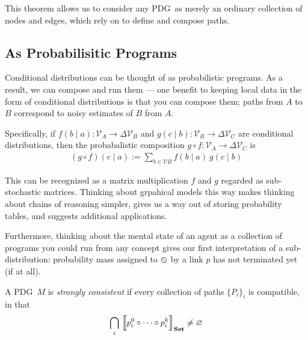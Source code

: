 \documentclass{article}
\newcommand\Set{\textbf{Set}}
\newcommand{\none}{\varobslash}
\newcommand{\MN}{PDG}
\newcommand{\MNs}{\MN s}
\begin{document}
	This theorem allows us to consider any \MN\ as merely an ordinary collection of nodes and edges, which rely on to define and compose paths.
	

	
	
	\subsection{As Probabilisitic Programs}\label{sec:prog-semantics}
	
	Conditional distributions can be thought of as probabilistic programs. As a result, we can compose and run them --- one  benefit to keeping local data in the form of conditional distributions is that you can compose them; paths from $A$ to $B$ correspond to noisy estimates of $B$ from $A$.
	
	Specifically, if $f(b \mid a) : \mathcal V_A \to \Delta \mathcal V_B$ and $g(c \mid b) : \mathcal V_B \to \Delta \mathcal V_C$ are conditional distributions, then the probabalistic composition $g\circ f : \mathcal V_A \to \Delta\mathcal V_C$ is
	\begin{align*}
			(g\circ  f) (c \mid a) :=  \sum_{b \in \mathcal V B}\!\! f (b \mid a)\ g(c \mid b)
	\end{align*}
	
	This can be recognized as a matrix multiplication $f$ and $g$ regarded as sub-stochastic matrices.
	Thinking about grpahical models this way makes thinking about chains of reasoning simpler, gives us a way out of storing probability tables, and suggests additional applications.
	
	Furthermore, thinking about the mental state of an agent as a collection of programs you could run from any concept gives our first interpretation of a sub-distribution: probability mass assigned to $\none$ by a link $p$ has not terminated yet (if at all). 
	
	\begin{defn}
		A \MN\ $M$ is \emph{strongly consistent} if every collection of paths $\{P_i\}_i$ is compatible, in that 
		$$\bigcap_i\ \bbr*{\vphantom{\Big|}p_i^0\circ \cdots\circ p_i^k}_\Set \neq \varnothing$$
	\end{defn}
\end{document}
